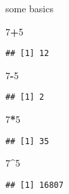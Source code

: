 \documentclass[8pt,ignorenonframetext,]{beamer}
\newenvironment{Shaded}{\begin{snugshade}}{\end{snugshade}}
\newcommand{\DecValTok}[1]{\textcolor[rgb]{0.00,0.00,0.81}{#1}}
\newcommand{\OperatorTok}[1]{\textcolor[rgb]{0.81,0.36,0.00}{\textbf{#1}}}
\begin{document}
\begin{frame}[fragile]{some basics}

\begin{Shaded}
\begin{Highlighting}[]
\DecValTok{7}\OperatorTok{+}\DecValTok{5}
\end{Highlighting}
\end{Shaded}

\begin{verbatim}
## [1] 12
\end{verbatim}

\begin{Shaded}
\begin{Highlighting}[]
\DecValTok{7}\OperatorTok{-}\DecValTok{5}
\end{Highlighting}
\end{Shaded}

\begin{verbatim}
## [1] 2
\end{verbatim}

\begin{Shaded}
\begin{Highlighting}[]
\DecValTok{7}\OperatorTok{*}\DecValTok{5}
\end{Highlighting}
\end{Shaded}

\begin{verbatim}
## [1] 35
\end{verbatim}

\begin{Shaded}
\begin{Highlighting}[]
\DecValTok{7}\OperatorTok{^}\DecValTok{5}
\end{Highlighting}
\end{Shaded}

\begin{verbatim}
## [1] 16807
\end{verbatim}

\end{frame}
\end{document}
